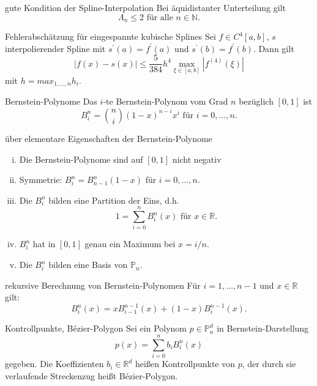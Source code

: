 \begin{flashcard}[Satz]{gute Kondition der Spline-Interpolation}
Bei äquidistanter Unterteilung gilt
$$
	\Lambda_n \leq 2 \text{ für alle } n \in \mathbb{N}.
$$
\end{flashcard}

\begin{flashcard}[Satz]{Fehlerabschätzung für eingespannte kubische Splines}
Sei $f \in C^4[a,b]$, $s$ interpolierender Spline mit $s^\prime(a) = f^\prime(a)$ und $s^\prime(b) = f^\prime(b)$.
Dann gilt
$$
	|f(x) - s(x)| \leq \frac{5}{384}h^4\max_{\xi \in [a,b]} |f^{(4)}(\xi)|
$$
mit $h = max_{1,\ldots ,n} h_i$.
\end{flashcard}

\begin{flashcard}[Definition]{Bernstein-Polynome}
Das $i$-te Bernstein-Polynom vom Grad $n$ bezüglich $[0,1]$ ist
$$
	B_i^n = \binom{n}{i}(1-x)^{n-i}x^i \text{ für } i=0, \ldots , n.
$$
\end{flashcard}

\begin{flashcard}[Satz]{über elementare Eigenschaften der Bernstein-Polynome}
\begin{enumerate}[(i)]
	\item Die Bernstein-Polynome sind auf $[0,1]$ nicht negativ
	\item Symmetrie: $B_i^n = B_{n-1}^n(1-x)$ für $ i=0, \ldots , n$.
	\item Die $B_i^n$ bilden eine Partition der Eins, d.h.
	$$
		1 = \sum_{i=0}^n B_i^n(x) \text{ für } x \in \mathbb{R}.
	$$
	\item $B_i^n$ hat in $[0,1]$ genau ein Maximum bei $x = i/n$.
	\item Die $B_i^n$ bilden eine Basis von $\mathbb{P}_n$.
\end{enumerate}
\end{flashcard}

\begin{flashcard}[Satz]{rekursive Berechnung von Bernstein-Polynomen}
Für $i=1, \ldots , n-1$ und $x \in \mathbb{R}$ gilt:
$$
	B_i^n(x) = xB_{i-1}^{n-1}(x) + (1-x)B_i^{n-1}(x).
$$
\end{flashcard}

\begin{flashcard}[Definition]{Kontrollpunkte, Bézier-Polygon}
Sei ein Polynom $p \in \mathbb{P}_n^d$ in Bernstein-Darstellung
$$
	p(x) = \sum_{i=0}^n b_i B_i^n(x)
$$
gegeben. Die Koeffizienten $b_i \in \mathbb{R}^d$ heißen Kontrollpunkte von $p$,
der durch sie verlaufende Streckenzug heißt Bézier-Polygon.
\end{flashcard}

